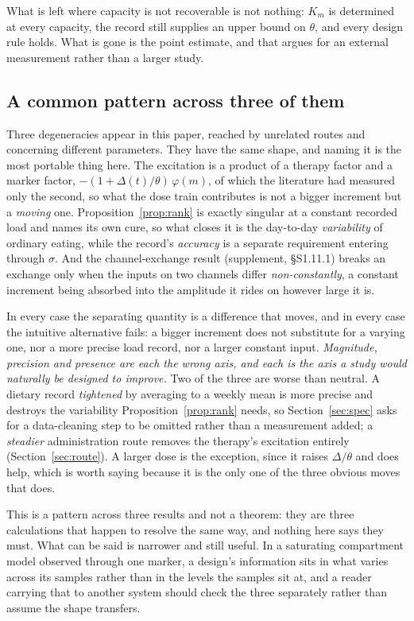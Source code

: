 What is left where capacity is not recoverable is not nothing: $K_m$ is determined at every
capacity, the record still supplies an upper bound on $\theta$, and every design rule
holds. What is gone is the point estimate, and that argues for an external measurement
rather than a larger study.

\subsection{A common pattern across three of them}

Three degeneracies appear in this paper, reached by unrelated routes and concerning
different parameters. They have the same shape, and naming it is the most portable thing
here. The excitation is a product of a therapy factor and a marker factor,
$-(1 + \Delta(t)/\theta)\,\varphi(m)$, of which the literature had measured only the
second, so what the dose train contributes is not a bigger increment but a \emph{moving}
one. Proposition~\ref{prop:rank} is exactly singular at a constant recorded load and names
its own cure, so what closes it is the day-to-day \emph{variability} of ordinary eating,
while the record's \emph{accuracy} is a separate requirement entering through $\sigma$. And
the channel-exchange result (supplement, \S S1.11.1) breaks an exchange only when the inputs on
two channels differ \emph{non-constantly}, a constant increment being absorbed into the
amplitude it rides on however large it is.

In every case the separating quantity is a difference that moves, and in every case the
intuitive alternative fails: a bigger increment does not substitute for a varying one, nor
a more precise load record, nor a larger constant input. \emph{Magnitude, precision and
presence are each the wrong axis, and each is the axis a study would naturally be designed
to improve.} Two of the three are worse than neutral. A dietary record \emph{tightened} by
averaging to a weekly mean is more precise and destroys the variability
Proposition~\ref{prop:rank} needs, so Section~\ref{sec:spec} asks for a data-cleaning step
to be omitted rather than a measurement added; a \emph{steadier} administration route
removes the therapy's excitation entirely (Section~\ref{sec:route}). A larger dose is the
exception, since it raises $\Delta/\theta$ and does help, which is worth saying because it
is the only one of the three obvious moves that does.

This is a pattern across three results and not a theorem: they are three calculations that
happen to resolve the same way, and nothing here says they must. What can be said is
narrower and still useful. In a saturating compartment model observed through one marker, a
design's information sits in what varies across its samples rather than in the levels the
samples sit at, and a reader carrying that to another system should check the three
separately rather than assume the shape transfers.

